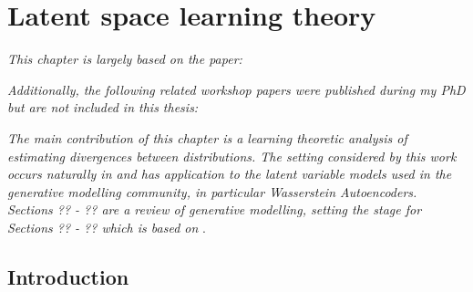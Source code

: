 \chapter{Latent space learning theory}\label{chapter:latent-space-learning-theory}

\ifpdf
    \graphicspath{{Chapter5/Figs/Raster/}{Chapter5/Figs/PDF/}{Chapter5/Figs/}}
\else
    \graphicspath{{Chapter5/Figs/Vector/}{Chapter5/Figs/}}
\fi

\emph{This chapter is largely based on the paper:}

\begin{quote}
\end{quote}

\emph{Additionally, the following related workshop papers were published during my PhD but are not included in this thesis:}

\begin{quote}
\end{quote}

\begin{quote}
\end{quote}

\emph{The main contribution of this chapter is a learning theoretic analysis of estimating divergences between distributions. 
The setting considered by this work occurs naturally in and has application to the latent variable models used in the generative modelling community, in particular Wasserstein Autoencoders.
Sections ?? - ?? are a review of generative modelling, setting the stage for Sections ?? - ?? which is based on} \cite{rubenstein2019practical}.


\section{Introduction}

